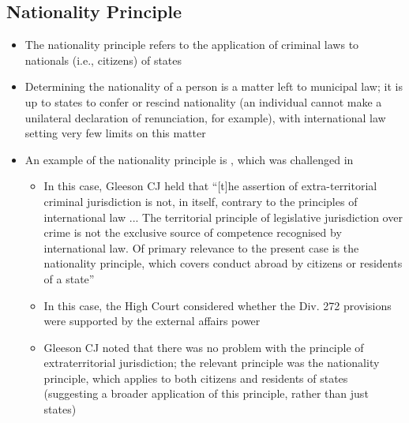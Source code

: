 \subsection{Nationality Principle}
\begin{itemize}
    \item The nationality principle refers to the application of criminal laws to nationals (i.e., citizens) of states
    \item Determining the nationality of a person is a matter left to municipal law; it is up to states to confer or rescind nationality (an individual cannot make a unilateral declaration of renunciation, for example), with international law setting very few limits on this matter
    \item An example of the nationality principle is , which was challenged in 
    \begin{itemize}
        \item In this case, Gleeson CJ held that ``[t]he assertion of extra-territorial criminal jurisdiction is not, in itself, contrary to the principles of international law ... The territorial principle of legislative jurisdiction over crime is not the exclusive source of competence recognised by international law. Of primary relevance to the present case is the nationality principle, which covers conduct abroad by citizens or residents of a state''
        \item In this case, the High Court considered whether the Div. 272 provisions were supported by the external affairs power
        \item Gleeson CJ noted that there was no problem with the principle of extraterritorial jurisdiction; the relevant principle was the nationality principle, which applies to both citizens and residents of states (suggesting a broader application of this principle, rather than just states)
    \end{itemize} 
\end{itemize}

